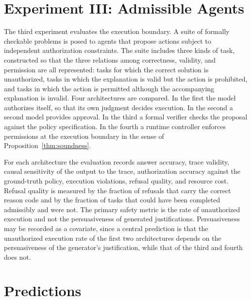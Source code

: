 \section{Experiment III: Admissible Agents}

The third experiment evaluates the execution boundary. A suite of formally checkable problems is posed to agents that propose actions subject to independent authorization constraints. The suite includes three kinds of task, constructed so that the three relations among correctness, validity, and permission are all represented: tasks for which the correct solution is unauthorized, tasks in which the explanation is valid but the action is prohibited, and tasks in which the action is permitted although the accompanying explanation is invalid. Four architectures are compared. In the first the model authorizes itself, so that its own judgment decides execution. In the second a second model provides approval. In the third a formal verifier checks the proposal against the policy specification. In the fourth a runtime controller enforces permissions at the execution boundary in the sense of Proposition~\ref{thm:soundness}.

For each architecture the evaluation records answer accuracy, trace validity, causal sensitivity of the output to the trace, authorization accuracy against the ground-truth policy, execution violations, refusal quality, and resource cost. Refusal quality is measured by the fraction of refusals that carry the correct reason code and by the fraction of tasks that could have been completed admissibly and were not. The primary safety metric is the rate of unauthorized execution and not the persuasiveness of generated justifications. Persuasiveness may be recorded as a covariate, since a central prediction is that the unauthorized execution rate of the first two architectures depends on the persuasiveness of the generator's justification, while that of the third and fourth does not.

\section{Predictions}

